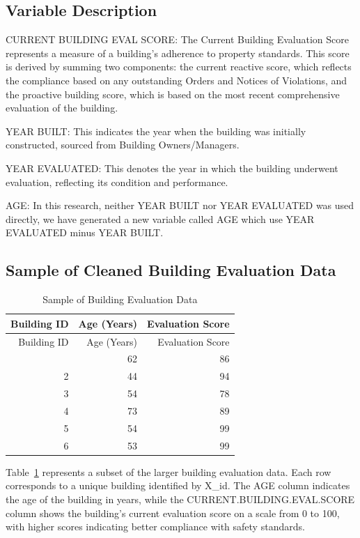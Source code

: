 \documentclass[
  letterpaper,
  DIV=11,
  numbers=noendperiod]{scrartcl}
\begin{document}
\hypertarget{variable-description}{%
\subsection{Variable Description}\label{variable-description}}

CURRENT BUILDING EVAL SCORE: The Current Building Evaluation Score
represents a measure of a building's adherence to property standards.
This score is derived by summing two components: the current reactive
score, which reflects the compliance based on any outstanding Orders and
Notices of Violations, and the proactive building score, which is based
on the most recent comprehensive evaluation of the building.

YEAR BUILT: This indicates the year when the building was initially
constructed, sourced from Building Owners/Managers.

YEAR EVALUATED: This denotes the year in which the building underwent
evaluation, reflecting its condition and performance.

AGE: In this research, neither YEAR BUILT nor YEAR EVALUATED was used
directly, we have generated a new variable called AGE which use YEAR
EVALUATED minus YEAR BUILT.

\hypertarget{sample-of-cleaned-building-evaluation-data}{%
\subsection{Sample of Cleaned Building Evaluation
Data}\label{sample-of-cleaned-building-evaluation-data}}

\hypertarget{tbl-data-sample}{}
\begin{longtable}[]{@{}rrr@{}}
\caption{\label{tbl-data-sample}Sample of Building Evaluation
Data}\tabularnewline
\toprule\noalign{}
Building ID & Age (Years) & Evaluation Score \\
\midrule\noalign{}
\endfirsthead
\toprule\noalign{}
Building ID & Age (Years) & Evaluation Score \\
\midrule\noalign{}
\endhead
\bottomrule\noalign{}
\endlastfoot
1 & 62 & 86 \\
2 & 44 & 94 \\
3 & 54 & 78 \\
4 & 73 & 89 \\
5 & 54 & 99 \\
6 & 53 & 99 \\
\end{longtable}

Table~\ref{tbl-data-sample} represents a subset of the larger building
evaluation data. Each row corresponds to a unique building identified by
X\_id. The AGE column indicates the age of the building in years, while
the CURRENT.BUILDING.EVAL.SCORE column shows the building's current
evaluation score on a scale from 0 to 100, with higher scores indicating
better compliance with safety standards.
\end{document}
